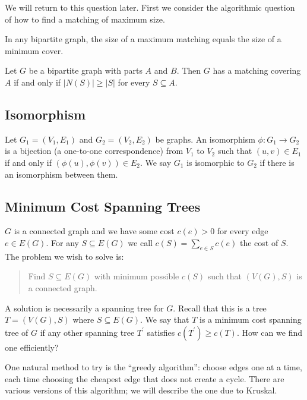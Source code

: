 We will return to this question later. First we consider the algorithmic question of how to find a matching of maximum size.

\begin{theorem}
In any bipartite graph, the size of a maximum matching equals the size of a minimum cover.
\end{theorem}

\begin{theorem}
Let $G$ be a bipartite graph with parts $A$ and $B$. Then $G$ has a matching covering $A$ if and only if $|N(S)|\ge|S|$ for every $S\subseteq A$.
\end{theorem}

\subsection{Isomorphism}
\begin{definition}[Isomorphism]
Let $G_1 = (V_1, E_1)$ and $G_2 = (V_2, E_2)$ be graphs. An isomorphism $\phi : G_1 \to G_2$ is a bijection (a one-to-one correspondence) from $V_1$ to $V_2$ such that $(u,v) \in E_1$ if and only if $(\phi(u),\phi(v)) \in E_2$. We say $G_1$ is isomorphic to $G_2$ if there is an isomorphism between them.
\end{definition}

\subsection{Minimum Cost Spanning Trees}
$G$ is a connected graph and we have some cost $c(e)>0$ for every edge $e\in E(G)$. For any $S\subseteq E(G)$ we call $c(S)=\sum_{e\in S}c(e)$ the cost of $S$. The problem we wish to solve is:

\begin{quote}
Find $S\subseteq E(G)$ with minimum possible $c(S)$ such that $(V(G),S)$ is a connected graph.
\end{quote}

A solution is necessarily a spanning tree for $G$. Recall that this is a tree $T=(V(G),S)$ where $S\subseteq E(G)$. We say that $T$ is a minimum cost spanning tree of $G$ if any other spanning tree $T^\prime$ satisfies $c(T^\prime)\ge c(T)$. How can we find one efficiently?

One natural method to try is the ``greedy algorithm'': choose edges one at a time, each time choosing the cheapest edge that does not create a cycle. There are various versions of this algorithm; we will describe the one due to Kruskal.

